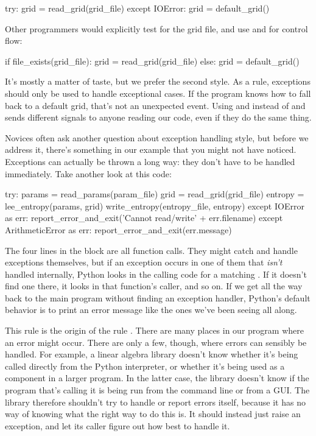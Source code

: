 \begin{VerbIn}
try:
    grid = read_grid(grid_file)
except IOError:
    grid = default_grid()
\end{VerbIn}

Other programmers would explicitly test for the grid file, and use
 and  for control flow:

\begin{VerbIn}
if file_exists(grid_file):
    grid = read_grid(grid_file)
else:
    grid = default_grid()
\end{VerbIn}

It's mostly a matter of taste, but we prefer the second style. As a
rule, exceptions should only be used to handle exceptional cases. If the
program knows how to fall back to a default grid, that's not an
unexpected event. Using  and  instead of
 and  sends different signals to anyone
reading our code, even if they do the same thing.

Novices often ask another question about exception handling style, but
before we address it, there's something in our example that you might
not have noticed. Exceptions can actually be thrown a long way: they
don't have to be handled immediately. Take another look at this code:

\begin{VerbIn}
try:
    params = read_params(param_file)
    grid = read_grid(grid_file)
    entropy = lee_entropy(params, grid)
    write_entropy(entropy_file, entropy)
except IOError as err:
    report_error_and_exit('Cannot read/write' + err.filename)
except ArithmeticError as err:
    report_error_and_exit(err.message)
\end{VerbIn}

The four lines in the  block are all function calls. They
might catch and handle exceptions themselves, but if an exception occurs
in one of them that \emph{isn't} handled internally, Python looks in the
calling code for a matching . If it doesn't find one
there, it looks in that function's caller, and so on. If we get all the
way back to the main program without finding an exception handler,
Python's default behavior is to print an error message like the ones
we've been seeing all along.

This rule is the origin of the rule
. There
are many places in our program where an error might occur. There are
only a few, though, where errors can sensibly be handled. For example, a
linear algebra library doesn't know whether it's being called directly
from the Python interpreter, or whether it's being used as a component
in a larger program. In the latter case, the library doesn't know if the
program that's calling it is being run from the command line or from a
GUI. The library therefore shouldn't try to handle or report errors
itself, because it has no way of knowing what the right way to do this
is. It should instead just raise an exception, and let its caller figure
out how best to handle it.

